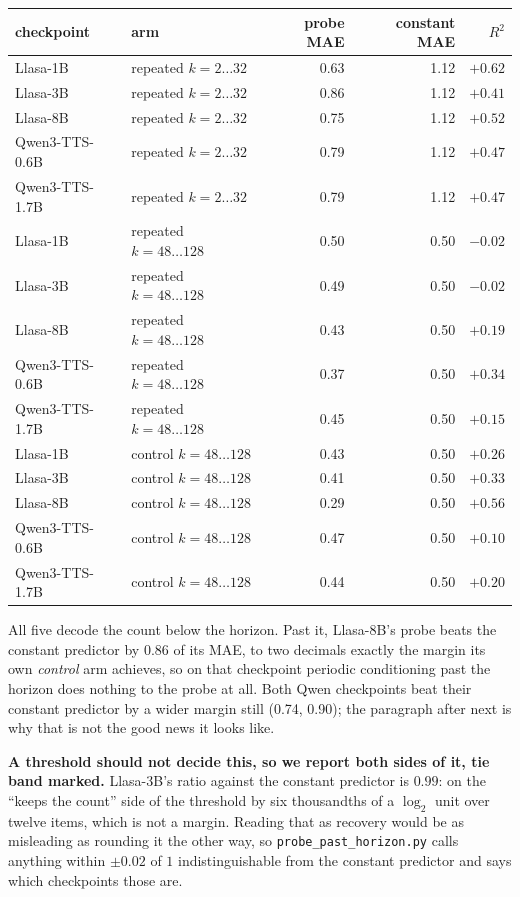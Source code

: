 \documentclass[11pt]{article}
\begin{document}
\begin{center}
\begin{tabular}{llrrr}
\toprule
checkpoint & arm & probe MAE & constant MAE & $R^2$ \\
\midrule
Llasa-1B       & repeated $k=2\ldots32$    & 0.63 & 1.12 & $+0.62$ \\
Llasa-3B       & repeated $k=2\ldots32$    & 0.86 & 1.12 & $+0.41$ \\
Llasa-8B       & repeated $k=2\ldots32$    & 0.75 & 1.12 & $+0.52$ \\
Qwen3-TTS-0.6B & repeated $k=2\ldots32$    & 0.79 & 1.12 & $+0.47$ \\
Qwen3-TTS-1.7B & repeated $k=2\ldots32$    & 0.79 & 1.12 & $+0.47$ \\
\midrule
Llasa-1B       & repeated $k=48\ldots128$  & 0.50 & 0.50 & $-0.02$ \\
Llasa-3B       & repeated $k=48\ldots128$  & 0.49 & 0.50 & $-0.02$ \\
Llasa-8B       & repeated $k=48\ldots128$  & 0.43 & 0.50 & $+0.19$ \\
Qwen3-TTS-0.6B & repeated $k=48\ldots128$  & 0.37 & 0.50 & $+0.34$ \\
Qwen3-TTS-1.7B & repeated $k=48\ldots128$  & 0.45 & 0.50 & $+0.15$ \\
\midrule
Llasa-1B       & control $k=48\ldots128$   & 0.43 & 0.50 & $+0.26$ \\
Llasa-3B       & control $k=48\ldots128$   & 0.41 & 0.50 & $+0.33$ \\
Llasa-8B       & control $k=48\ldots128$   & 0.29 & 0.50 & $+0.56$ \\
Qwen3-TTS-0.6B & control $k=48\ldots128$   & 0.47 & 0.50 & $+0.10$ \\
Qwen3-TTS-1.7B & control $k=48\ldots128$   & 0.44 & 0.50 & $+0.20$ \\
\bottomrule
\end{tabular}
\end{center}

\noindent All five decode the count below the horizon. Past it, Llasa-8B's probe
beats the constant predictor by 0.86 of its MAE, to two decimals exactly the
margin its own \emph{control} arm achieves, so on that checkpoint periodic
conditioning past the horizon does nothing to the probe at all. Both Qwen
checkpoints beat their constant predictor by a wider margin still (0.74, 0.90);
the paragraph after next is why that is not the good news it looks like.

\noindent\textbf{A threshold should not decide this, so we report both sides of
it, tie band marked.} Llasa-3B's ratio against the constant predictor is $0.99$:
on the ``keeps the count'' side of the threshold by six thousandths of a
$\log_2$ unit over twelve items, which is not a margin. Reading that as recovery
would be as misleading as rounding it the other way, so
\texttt{probe\_past\_horizon.py} calls anything within $\pm0.02$ of $1$
indistinguishable from the constant predictor and says which checkpoints those
are.
\end{document}
